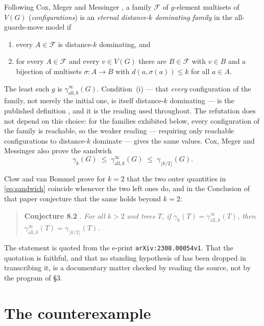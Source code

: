 \documentclass[11pt]{amsart}
\begin{document}
Following Cox, Meger and Messinger \cite{CMM}, a family $\mathcal F$ of
$g$-element multisets of $V(G)$ (\emph{configurations}) is an \emph{eternal
distance-$k$ dominating family} in the all-guards-move model if
\begin{enumerate}
\item[(i)] every $A\in\mathcal F$ is distance-$k$ dominating, and
\item[(ii)] for every $A\in\mathcal F$ and every $v\in V(G)$ there are
  $B\in\mathcal F$ with $v\in B$ and a bijection of multisets
  $\sigma\colon A\to B$ with $d(a,\sigma(a))\le k$ for all $a\in A$.
\end{enumerate}
The least such $g$ is $\gamma_{\mathrm{all},k}^{\infty}(G)$. Condition~(i) ---
that \emph{every} configuration of the family, not merely the initial one, is
itself distance-$k$ dominating --- is the published definition \cite[\S2]{CMM},
and it is the reading used throughout. The refutation does not depend on this
choice: for the families exhibited below, every configuration of the family is
reachable, so the weaker reading --- requiring only reachable configurations to
distance-$k$ dominate --- gives the same values. Cox, Meger and Messinger also prove the
sandwich
\begin{equation}\label{eq:sandwich}
 \gamma_k(G)\;\le\;\gamma_{\mathrm{all},k}^{\infty}(G)\;\le\;
 \gamma_{\lfloor k/2\rfloor}(G).
\end{equation}

Clow and van Bommel \cite{CvB} prove for $k=2$ that the two outer quantities in
\eqref{eq:sandwich} coincide whenever the two left ones do, and in the
Conclusion of that paper conjecture that the same holds beyond $k=2$:

\begin{quote}
\textbf{Conjecture 8.2} \cite{CvB}. \emph{For all $k>2$ and trees $T$, if
$\gamma_k(T)=\gamma_{\mathrm{all},k}^{\infty}(T)$, then
$\gamma_{\mathrm{all},k}^{\infty}(T)=\gamma_{\lfloor k/2\rfloor}(T)$.}
\end{quote}

\noindent The statement is quoted from the e-print
\texttt{arXiv:2308.00054v1}. That the quotation is faithful, and that no
standing hypothesis of \cite{CvB} has been dropped in transcribing it, is a
documentary matter checked by reading the source, not by the program of \S3.

\section{The counterexample}
\end{document}
